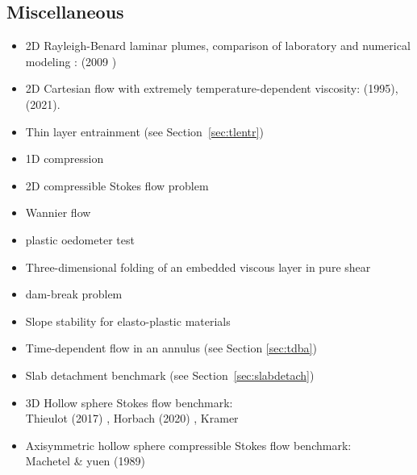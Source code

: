 \subsection{Miscellaneous}

\begin{itemize}

\item 2D Rayleigh-Benard laminar plumes, comparison of laboratory 
      and numerical modeling : 
      \textcite{vavl09} (2009
)
\item 2D Cartesian flow with extremely temperature-dependent viscosity:
      \textcite{moso95} (1995), \textcite{trbs21} (2021).

\item Thin layer entrainment (see Section~\ref{sec:tlentr})

\item 1D compression \cite{modm02}

\item 2D compressible Stokes flow problem 
      \cite{itki94,tagu07,lezh08,kilv10,lizh13,lee_13}

\item Wannier flow \cite{wann50,yemu99,cehg14}

\item plastic oedometer test  \cite{chtl13}

\item Three-dimensional folding of an embedded viscous layer in 
      pure shear \cite{flet91}

\item dam-break problem 
      \cite{moeb99,bacp07,liir07,lemx08,homa09,anco09,grdn97,hini81,basd08}

\item Slope stability for elasto-plastic materials \cite{rama16}

\item Time-dependent flow in an annulus \cite{galb19} (see Section \ref{sec:tdba})

\item Slab detachment benchmark (see Section~\ref{sec:slabdetach}) 

\item 3D Hollow sphere Stokes flow benchmark:\\
      Thieulot (2017) \cite{thie17},
      Horbach \etal (2020) \cite{homb20},
      Kramer \etal \cite{krdw21}

\item Axisymmetric hollow sphere compressible Stokes flow benchmark:\\
      Machetel \& yuen (1989) \cite{mayu89}


\end{itemize}
